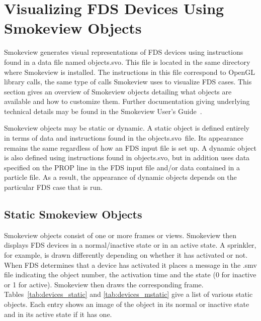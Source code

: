 
\newcommand{\devicewidth}{1.5in}
\newcommand{\boxwidth}{3.0in}
\newcommand{\incgraphics}[1]{
\parbox[c]{\devicewidth}{
\vspace{0.01in}
\texttt{[image: \#1]}
\vspace{0.01in}
}
}

\section{Visualizing FDS Devices Using Smokeview Objects}

Smokeview generates visual representations of FDS devices using instructions found in a data file named {\ct objects.svo}.  This file is located in the same directory where Smokeview is installed.  The instructions in this file correspond to OpenGL library calls, the same type of calls Smokeview uses to visualize FDS cases.  This section gives an overview of Smokeview objects detailing what objects are available and how to customize them.  Further documentation giving underlying technical details may be found in the Smokeview User's Guide~\cite{Smokeview_Users_Guide}.

Smokeview objects may be static or dynamic.  A static object is defined entirely in terms of data and instructions found in the {\ct objects.svo}\ file.  Its appearance remains the same regardless of how an FDS input file is set up.  A dynamic object is also defined using instructions found in {\ct objects.svo}, but in addition uses data specified on the {\ct PROP}  line in the FDS input file and/or data contained in a particle file.  As a result, the appearance of dynamic objects depends on the particular FDS case that is run.


\subsection{Static Smokeview Objects}
\label{info:SMOKEVIEW_ID}

Smokeview objects consist of one or more frames or views.  Smokeview then displays FDS devices in a normal/inactive
state or in an active state.  A sprinkler, for example, is drawn differently depending on whether it has activated
or not.  When FDS determines that a device has activated it places a message in the {\ct .smv} file indicating the
object number, the activation time and the state (0 for inactive or 1 for active).  Smokeview then draws the corresponding
frame.  Tables~\ref{tab:devices_static} and \ref{tab:devices_mstatic} give a list of various static objects.  Each entry shows
an image of the object in its normal or inactive state and in its active state if it has one.

